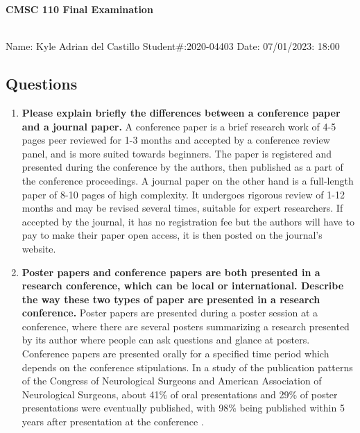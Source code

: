 \documentclass{article}
\begin{document}
\begin{center}
  \textbf{CMSC 110 Final Examination}
  \\~\\
  \raggedright Name: Kyle Adrian del Castillo \hfill
  \centering Student\#:2020-04403 \hfill
  \raggedleft Date: 07/01/2023: 18:00
\end{center}

\subsection*{Questions}

\hfill
\begin{enumerate}
  \item \textbf{Please explain briefly the differences between a conference paper and a journal paper.}
  \subitem A conference paper is a brief research work of 4-5 pages peer reviewed for 1-3 months and accepted by a conference review panel, and is more suited towards beginners. The paper is registered and presented during the conference by the authors, then published as a part of the conference proceedings.
  \subitem A journal paper on the other hand is a full-length paper of 8-10 pages of high complexity. It undergoes rigorous review of 1-12 months and may be revised several times, suitable for expert researchers. If accepted by the journal, it has no registration fee but the authors will have to pay to make their paper open access, it is then posted on the journal’s website.

  \item \textbf{Poster papers and conference papers are both presented in a research conference, which can be local or international. Describe the way these two types of paper are presented in a research conference.}
  \subitem Poster papers are presented during a poster session at a conference, where there are several posters summarizing a research presented by its author where people can ask questions and glance at posters. Conference papers are presented orally for a specified time period which depends on the conference stipulations.
  \subitem In a study of the publication patterns of the Congress of Neurological Surgeons and American Association of Neurological Surgeons, about 41\% of oral presentations and 29\% of poster presentations were eventually published, with 98\% being published within 5 years after presentation at the conference \citep{patel_publication_2011}.


\end{enumerate}
\end{document}
